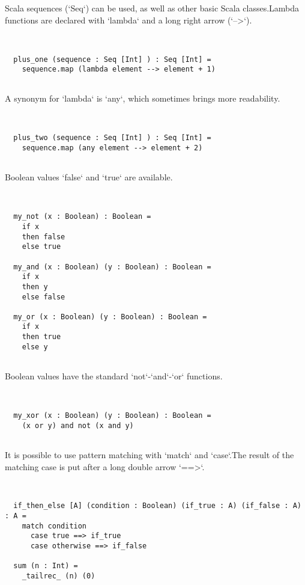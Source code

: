 \documentclass[12pt,a4paper]{article}
\begin{document}
Scala sequences (`Seq`) can be used, as well as other basic Scala classes.Lambda functions are declared with `lambda` and a long right arrow (`-->`). 


\begin{lstlisting}


  plus_one (sequence : Seq [Int] ) : Seq [Int] =
    sequence.map (lambda element --> element + 1)


\end{lstlisting}

A synonym for `lambda` is `any`, which sometimes brings more readability. 


\begin{lstlisting}


  plus_two (sequence : Seq [Int] ) : Seq [Int] =
    sequence.map (any element --> element + 2)


\end{lstlisting}

Boolean values `false` and `true` are available. 


\begin{lstlisting}


  my_not (x : Boolean) : Boolean =
    if x
    then false
    else true

  my_and (x : Boolean) (y : Boolean) : Boolean =
    if x
    then y
    else false

  my_or (x : Boolean) (y : Boolean) : Boolean =
    if x
    then true
    else y


\end{lstlisting}

Boolean values have the standard `not`-`and`-`or` functions. 


\begin{lstlisting}


  my_xor (x : Boolean) (y : Boolean) : Boolean =
    (x or y) and not (x and y)


\end{lstlisting}

It is possible to use pattern matching with `match` and `case`.The result of the matching case is put after a long double arrow `==>`. 


\begin{lstlisting}


  if_then_else [A] (condition : Boolean) (if_true : A) (if_false : A) : A =
    match condition
      case true ==> if_true
      case otherwise ==> if_false

  sum (n : Int) =
    _tailrec_ (n) (0)


\end{lstlisting}
\end{document}
